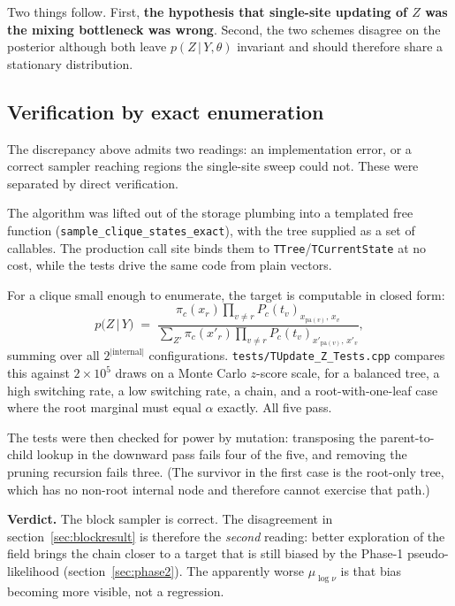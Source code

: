 \documentclass[11pt,a4paper]{article}
\newcommand{\Ys}{Y}
\newcommand{\pa}{\mathrm{pa}}
\newcommand{\given}{\,\vert\,}
\begin{document}
Two things follow. First, \textbf{the hypothesis that single-site updating of $Z$ was the
mixing bottleneck was wrong}. Second, the two schemes disagree on the posterior although both
leave $p(Z \given \Ys,\theta)$ invariant and should therefore share a stationary
distribution.

\subsection{Verification by exact enumeration}
\label{sec:enumtest}

The discrepancy above admits two readings: an implementation error, or a correct sampler
reaching regions the single-site sweep could not. These were separated by direct
verification.

The algorithm was lifted out of the storage plumbing into a templated free function
(\texttt{sample\_clique\_states\_exact}), with the tree supplied as a set of callables. The
production call site binds them to \texttt{TTree}/\texttt{TCurrentState} at no cost, while
the tests drive the same code from plain vectors.

For a clique small enough to enumerate, the target is computable in closed form:
\[
  p\bigl(Z \given \Ys\bigr)
  \;=\;
  \frac{\pi_c(x_{r})\prod_{v \ne r} P_c(t_v)_{x_{\pa(v)},\,x_v}}
       {\sum_{Z'} \pi_c(x'_{r})\prod_{v \ne r} P_c(t_v)_{x'_{\pa(v)},\,x'_v}},
\]
summing over all $2^{\lvert\text{internal}\rvert}$ configurations. \texttt{tests/TUpdate\_Z\_Tests.cpp}
compares this against $2\times10^{5}$ draws on a Monte Carlo $z$-score scale, for a balanced
tree, a high switching rate, a low switching rate, a chain, and a root-with-one-leaf case
where the root marginal must equal $\alpha$ exactly. All five pass.

The tests were then checked for power by mutation: transposing the parent-to-child lookup in
the downward pass fails four of the five, and removing the pruning recursion fails three. (The
survivor in the first case is the root-only tree, which has no non-root internal node and
therefore cannot exercise that path.)

\medskip
\noindent\textbf{Verdict.} The block sampler is correct. The disagreement in
section~\ref{sec:blockresult} is therefore the \emph{second} reading: better exploration of
the field brings the chain closer to a target that is still biased by the Phase-1
pseudo-likelihood (section~\ref{sec:phase2}). The apparently worse $\mu_{\log\nu}$ is that
bias becoming more visible, not a regression.
\end{document}
